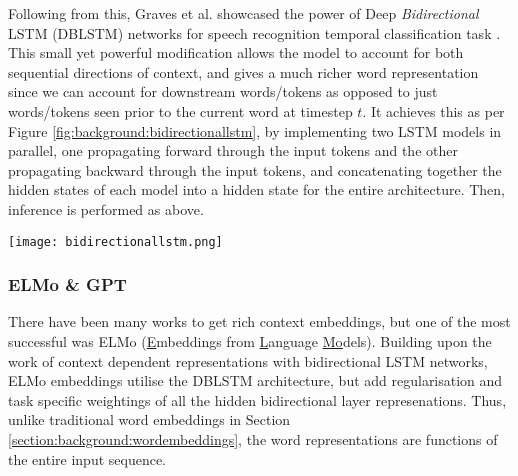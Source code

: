 {{Following from this, Graves et al. showcased the power of Deep \textit{Bidirectional} LSTM (DBLSTM) networks for speech recognition temporal classification task \cite{Graves2013}. This small yet powerful modification allows the model to account for both sequential directions of context, and gives a much richer word representation since we can account for downstream words/tokens as opposed to just words/tokens seen prior to the current word at timestep $t$. It achieves this as per Figure \ref{fig:background:bidirectionallstm}, by implementing two LSTM models in parallel, one propagating forward through the input tokens and the other propagating backward through the input tokens, and concatenating together the hidden states of each model into a hidden state for the entire architecture. Then, inference is performed as above.

\begin{center}
	\texttt{[image: bidirectionallstm.png]}
	\label{fig:background:bidirectionallstm}
\end{center}

\subsubsection{ELMo \& GPT}
There have been many works to get rich context embeddings, but one of the most successful was ELMo \cite{Peters2018a} (\underline{E}mbeddings from \underline{L}anguage \underline{Mo}dels). Building upon the work of context dependent representations with bidirectional LSTM networks, ELMo embeddings utilise the DBLSTM architecture, but add regularisation and task specific weightings of all the hidden bidirectional layer represenations. Thus, unlike traditional word embeddings in Section \ref{section:background:wordembeddings}, the word representations are functions of the entire input sequence.

}}

